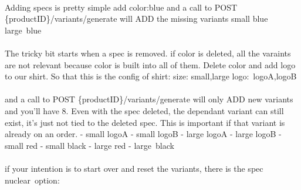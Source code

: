 \documentclass{memoir}%
\begin{document}
%
\paragraph*{}%
Adding specs is pretty simple\newline%
add color:blue\newline%
and a call to \newline%
POST \{productID\}/variants/generate\newline%
will ADD the missing variants    small blue   large~blue

%
\paragraph*{}%
The tricky bit starts when a spec is removed. if color is deleted, all the varaints are not relevant because color is built into all of them. Delete color and add logo to our shirt. So that this is the config of shirt:\newline%
    size: small,large\newline%
    logo:~logoA,logoB

%
\paragraph*{}%
and a call to \newline%
POST \{productID\}/variants/generate\newline%
will only ADD new variants and you’ll have 8. Even with the spec deleted, the dependant variant can still exist, it’s just not tied to the deleted spec. This is important if that variant is already on an order.\newline%
{-} small logoA\newline%
{-} small logoB\newline%
{-} large logoA\newline%
{-} large logoB\newline%
{-} small red\newline%
{-} small black\newline%
{-} large red\newline%
{-} large~black

%
\paragraph*{}%
if your intention is to start over and reset the variants, there is the spec nuclear~option:
\end{document}
